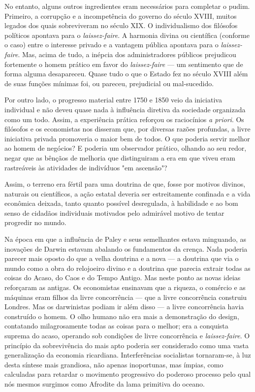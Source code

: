 \documentclass[12pt]{article}
\begin{document}
No entanto, alguns outros ingredientes eram necessários para completar o pudim. Primeiro, a corrupção e a incompetência do governo do século XVIII, muitos legados dos quais sobreviveram no século XIX. O individualismo dos filósofos políticos apontava para o \textit{laissez-faire}. A harmonia divina ou científica (conforme o caso) entre o interesse privado e a vantagem pública apontava para o \textit{laissez-faire}. Mas, acima de tudo, a inépcia dos administradores públicos prejudicou fortemente o homem prático em favor do \textit{laissez-faire} — um sentimento que de forma alguma desapareceu. Quase tudo o que o Estado fez no século XVIII além de suas funções mínimas foi, ou pareceu, prejudicial ou mal-sucedido.

Por outro lado, o progresso material entre 1750 e 1850 veio da iniciativa individual e não deveu quase nada à influência diretiva da sociedade organizada como um todo. Assim, a experiência prática reforçou os raciocínios \textit{a priori}. Os filósofos e os economistas nos disseram que, por diversas razões profundas, a livre iniciativa privada promoveria o maior bem de todos. O que poderia servir melhor ao homem de negócios? E poderia um observador prático, olhando ao seu redor, negar que as bênçãos de melhoria que distinguiram a era em que viveu eram rastreáveis às atividades de indivíduos "em ascensão"?

Assim, o terreno era fértil para uma doutrina de que, fosse por motivos divinos, naturais ou científicos, a ação estatal deveria ser estreitamente confinada e a vida econômica deixada, tanto quanto possível desregulada, à habilidade e ao bom senso de cidadãos individuais motivados pelo admirável motivo de tentar progredir no mundo.

Na época em que a influência de Paley e seus semelhantes estava minguando, as inovações de Darwin estavam abalando os fundamentos da crença. Nada poderia parecer mais oposto do que a velha doutrina e a nova — a doutrina que via o mundo como a obra do relojoeiro divino e a doutrina que parecia extrair todas as coisas do Acaso, do Caos e do Tempo Antigo. Mas neste ponto as novas ideias reforçaram as antigas. Os economistas ensinavam que a riqueza, o comércio e as máquinas eram filhos da livre concorrência — que a livre concorrência construiu Londres. Mas os darwinistas podiam ir além disso — a livre concorrência havia construído o homem. O olho humano não era mais a demonstração do design, contatando milagrosamente todas as coisas para o melhor; era a conquista suprema do acaso, operando sob condições de livre concorrência e \textit{laissez-faire}. O princípio da sobrevivência do mais apto poderia ser considerado como uma vasta generalização da economia ricardiana. Interferências socialistas tornaram-se, à luz desta síntese mais grandiosa, não apenas inoportunas, mas ímpias, como calculadas para retardar o movimento progressivo do poderoso processo pelo qual nós mesmos surgimos como Afrodite da lama primitiva do oceano.
\end{document}
